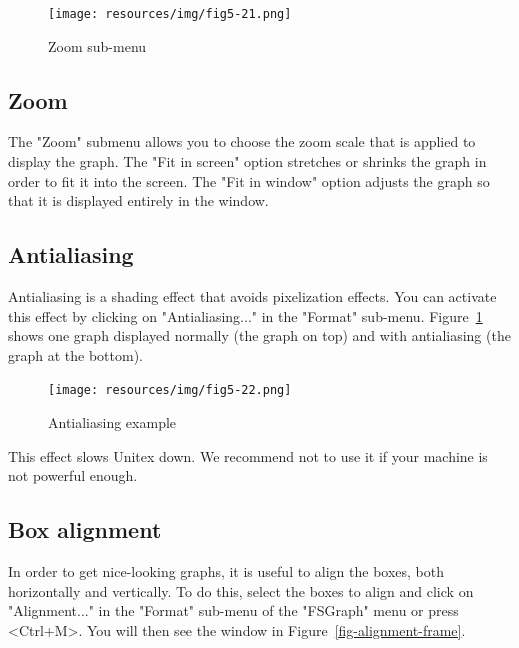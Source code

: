 \begin{figure}[!ht]
\begin{center}
\texttt{[image: resources/img/fig5-21.png]}
\caption{Zoom sub-menu}
\end{center}
\end{figure}
\subsection{Zoom}
The "Zoom" submenu allows you to choose the zoom scale that is applied to display the graph.
\noindent The "Fit in screen" option stretches or shrinks the graph in order to fit it into the screen. The "Fit in window" option adjusts the graph so that it is displayed entirely in the window.

\clearpage
\subsection{Antialiasing}
Antialiasing is a shading effect that avoids pixelization
effects. You can activate this effect by clicking on
"Antialiasing..." in the "Format" sub-menu. Figure~\ref{fig-antialiasing}
shows one graph displayed normally (the graph on top) and with antialiasing (the
graph at the bottom).

\bigskip
\begin{figure}[!ht]
\begin{center}
\texttt{[image: resources/img/fig5-22.png]}
\caption{Antialiasing example\label{fig-antialiasing}}
\end{center}
\end{figure}

\noindent This effect slows Unitex down. We recommend  not to use it if your
machine is not powerful enough.

\clearpage 
\subsection{Box alignment}

In order to get nice-looking graphs, it is useful to align the boxes, both
horizontally and  vertically. To do this, select the boxes to align and click on
"Alignment..." in the "Format" sub-menu of the "FSGraph" menu or press <Ctrl+M>.
You will then see the window in Figure~\ref{fig-alignment-frame}.

